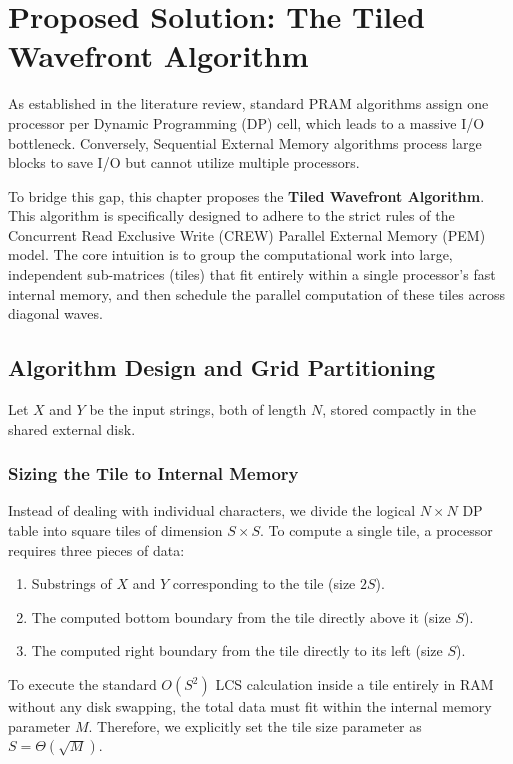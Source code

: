 
\chapter{Proposed Solution: The Tiled Wavefront Algorithm}

As established in the literature review, standard PRAM algorithms assign one processor per Dynamic Programming (DP) cell, which leads to a massive I/O bottleneck. Conversely, Sequential External Memory algorithms process large blocks to save I/O but cannot utilize multiple processors. 

To bridge this gap, this chapter proposes the \textbf{Tiled Wavefront Algorithm}. This algorithm is specifically designed to adhere to the strict rules of the Concurrent Read Exclusive Write (CREW) Parallel External Memory (PEM) model. The core intuition is to group the computational work into large, independent sub-matrices (tiles) that fit entirely within a single processor's fast internal memory, and then schedule the parallel computation of these tiles across diagonal waves.

\section{Algorithm Design and Grid Partitioning}

Let $X$ and $Y$ be the input strings, both of length $N$, stored compactly in the shared external disk. 

\subsection{Sizing the Tile to Internal Memory}
Instead of dealing with individual characters, we divide the logical $N \times N$ DP table into square tiles of dimension $S \times S$. To compute a single tile, a processor requires three pieces of data:
\begin{enumerate}
    \item Substrings of $X$ and $Y$ corresponding to the tile (size $2S$).
    \item The computed bottom boundary from the tile directly above it (size $S$).
    \item The computed right boundary from the tile directly to its left (size $S$).
\end{enumerate}

To execute the standard $O(S^2)$ LCS calculation\cite{clrs-ia-09} inside a tile entirely in RAM without any disk swapping, the total data must fit within the internal memory parameter $M$. Therefore, we explicitly set the tile size parameter as $S = \Theta(\sqrt{M})$.

